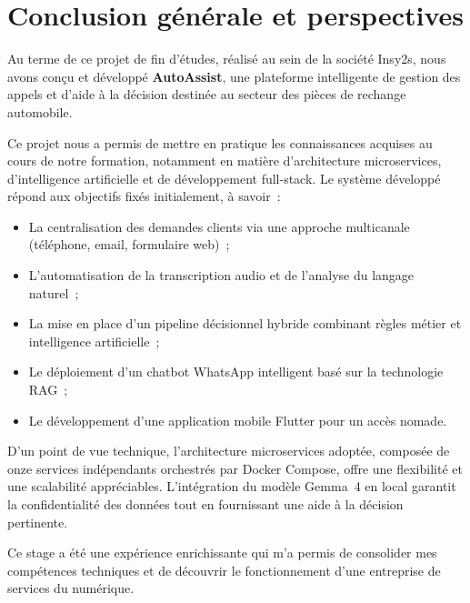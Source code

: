 \chapter*{Conclusion g\'{e}n\'{e}rale et perspectives}

\indent Au terme de ce projet de fin d'\'{e}tudes, r\'{e}alis\'{e} au sein de la soci\'{e}t\'{e} Insy2s, nous avons con\c{c}u et d\'{e}velopp\'{e} \textbf{AutoAssist}, une plateforme intelligente de gestion des appels et d'aide \`{a} la d\'{e}cision destin\'{e}e au secteur des pi\`{e}ces de rechange automobile.

\indent Ce projet nous a permis de mettre en pratique les connaissances acquises au cours de notre formation, notamment en mati\`{e}re d'architecture microservices, d'intelligence artificielle et de d\'{e}veloppement full-stack. Le syst\`{e}me d\'{e}velopp\'{e} r\'{e}pond aux objectifs fix\'{e}s initialement, \`{a} savoir~:

\begin{itemize}
    \item La centralisation des demandes clients via une approche multicanale (t\'{e}l\'{e}phone, email, formulaire web)~;
    \item L'automatisation de la transcription audio et de l'analyse du langage naturel~;
    \item La mise en place d'un pipeline d\'{e}cisionnel hybride combinant r\`{e}gles m\'{e}tier et intelligence artificielle~;
    \item Le d\'{e}ploiement d'un chatbot WhatsApp intelligent bas\'{e} sur la technologie RAG~;
    \item Le d\'{e}veloppement d'une application mobile Flutter pour un acc\`{e}s nomade.
\end{itemize}

\indent D'un point de vue technique, l'architecture microservices adopt\'{e}e, compos\'{e}e de onze services ind\'{e}pendants orchestr\'{e}s par Docker Compose, offre une flexibilit\'{e} et une scalabilit\'{e} appr\'{e}ciables. L'int\'{e}gration du mod\`{e}le Gemma~4 en local garantit la confidentialit\'{e} des donn\'{e}es tout en fournissant une aide \`{a} la d\'{e}cision pertinente.

\indent Ce stage a \'{e}t\'{e} une exp\'{e}rience enrichissante qui m'a permis de consolider mes comp\'{e}tences techniques et de d\'{e}couvrir le fonctionnement d'une entreprise de services du num\'{e}rique.

